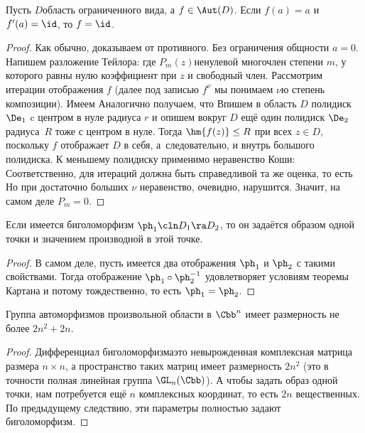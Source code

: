 \documentclass[a4paper]{article}
\begin{document}
\begin{theorem}[А.\,Картана]
Пусть $D$\т область ограниченного вида, а $f \in \Aut(D)$. Если $f(a) = a$ и $f'(a) = \id$, то
$f = \id$.
\end{theorem}
\begin{proof}
Как обычно, доказываем от противного. Без ограничения общности $a = 0$. Напишем разложение Тейлора:
где $P_m(z)$\т ненулевой многочлен степени $m$, у которого равны нулю коэффициент при $z$ и свободный член.
Рассмотрим итерации отображения $f$ (далее под записью $f^\nu$ мы понимаем $\nu$\д ю степень композиции).
Имеем
Аналогично получаем, что
Впишем в область $D$ полидиск $\De_1$ c центром в нуле радиуса $r$ и опишем вокруг $D$ ещё один
полидиск $\De_2$ радиуса~$R$ тоже с центром в нуле. Тогда $\hm{f(z)} \le R$ при всех $z \in D$, поскольку
$f$ отображает $D$ в себя, а~следовательно, и внутрь большого полидиска.
К меньшему полидиску применимо неравенство Коши:
Соответственно, для итераций должна быть справедливой та же оценка, то есть
Но при достаточно больших $\nu$ неравенство, очевидно, нарушится. Значит, на самом деле $P_m = 0$.
\end{proof}

\begin{imp}
Если имеется биголоморфизм $\ph_1\cln D_1 \ra D_2$, то он задаётся образом одной точки и значением
производной в этой точке.
\end{imp}
\begin{proof}
В самом деле, пусть имеется два отображения $\ph_1$ и $\ph_2$ с такими свойствами. Тогда
отображение $\ph_1\circ \ph_2^{-1}$ удовлетворяет условиям теоремы Картана и потому тождественно,
то есть $\ph_1 = \ph_2$.
\end{proof}

\begin{imp}
Группа автоморфизмов произвольной области в $\Cbb^n$ имеет размерность не более $2n^2+2n$.
\end{imp}
\begin{proof}
Дифференциал биголоморфизма\т это невырожденная комплексная матрица размера $n\times n$, а пространство
таких матриц имеет размерность $2n^2$ (это в точности полная линейная группа $\GL_n(\Cbb)$).
А чтобы задать образ одной точки, нам потребуется ещё $n$ комплексных координат, то есть $2n$ вещественных.
По предыдущему следствию, эти параметры полностью задают биголоморфизм.
\end{proof}
\end{document}
